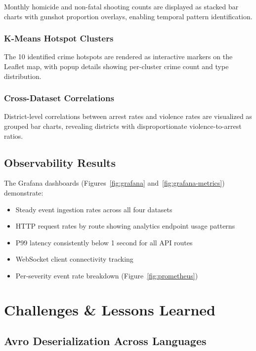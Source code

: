 \documentclass[12pt,a4paper]{article}
\begin{document}
Monthly homicide and non-fatal shooting counts are displayed as stacked bar charts with gunshot proportion overlays, enabling temporal pattern identification.

\subsubsection{K-Means Hotspot Clusters}

The 10 identified crime hotspots are rendered as interactive markers on the Leaflet map, with popup details showing per-cluster crime count and type distribution.

\subsubsection{Cross-Dataset Correlations}

District-level correlations between arrest rates and violence rates are visualized as grouped bar charts, revealing districts with disproportionate violence-to-arrest ratios.

\subsection{Observability Results}

The Grafana dashboards (Figures~\ref{fig:grafana} and~\ref{fig:grafana-metrics}) demonstrate:
\begin{itemize}
  \item Steady event ingestion rates across all four datasets
  \item HTTP request rates by route showing analytics endpoint usage patterns
  \item P99 latency consistently below 1 second for all API routes
  \item WebSocket client connectivity tracking
  \item Per-severity event rate breakdown (Figure~\ref{fig:prometheus})
\end{itemize}

\section{Challenges \& Lessons Learned}

\subsection{Avro Deserialization Across Languages}
\end{document}
